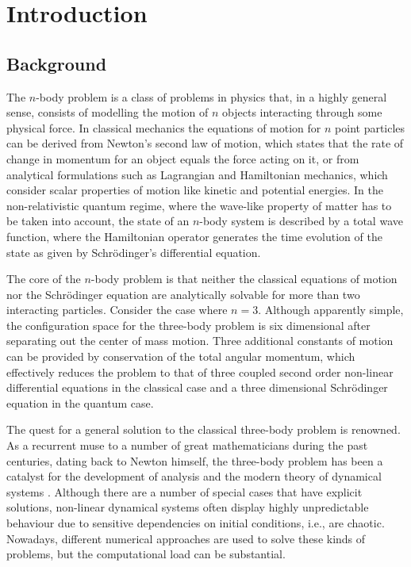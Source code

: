 \chapter{Introduction}
\section{Background}
The $n$-body problem is a class of problems in physics that, in a highly general sense, consists of modelling the motion of $n$ objects interacting through some physical force. In classical mechanics the equations of motion for $n$ point particles can be derived from Newton's second law of motion, which states that the rate of change in momentum for an object equals the force acting on it, or from analytical formulations such as Lagrangian and Hamiltonian mechanics, which consider scalar properties of motion like kinetic and potential energies. In the non-relativistic quantum regime, where the wave-like property of matter has to be taken into account, the state of an $n$-body system is described by a total wave function, where the Hamiltonian operator generates the time evolution of the state as given by Schr{\"o}dinger's differential equation.

The core of the $n$-body problem is that neither the classical equations of motion nor the Schr{\"o}dinger equation are analytically solvable for more than two interacting particles. Consider the case where $n=3$. Although apparently simple, the configuration space for the three-body problem is six dimensional after separating out the center of mass motion. Three additional constants of motion can be provided by conservation of the total angular momentum, which effectively reduces the problem to that of three coupled second order non-linear differential equations in the classical case and a three dimensional Schr{\"o}dinger equation in the quantum case. 

The quest for a general solution to the classical three-body problem is renowned. As a recurrent muse to a number of great mathematicians during the past centuries, dating back to Newton himself, the three-body problem has been a catalyst for the development of analysis and the modern theory of dynamical systems \cite{Chenciner2015}. Although there are a number of special cases that have explicit solutions, non-linear dynamical systems often display highly unpredictable behaviour due to sensitive dependencies on initial conditions, i.e., are chaotic. Nowadays, different numerical approaches are used to solve these kinds of problems, but the computational load can be substantial. 

